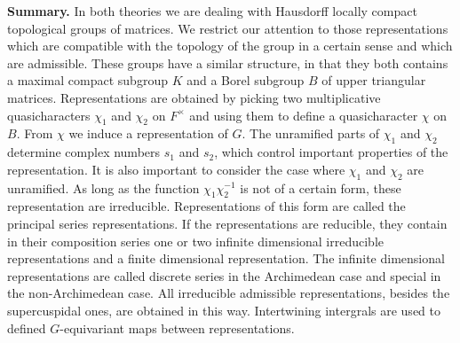 \documentclass[12pt, letterpaper, twoside]
{article}
\begin{document}
\textbf{Summary.} In both theories we are dealing with Hausdorff locally compact
topological groups of matrices. We restrict our attention to those
representations which are compatible with the topology of the group in a certain
sense and which are admissible. These groups have a similar structure, in that
they both contains a maximal compact subgroup $K$ and a Borel subgroup $B$ of
upper triangular matrices. Representations are obtained by picking two
multiplicative quasicharacters $\chi_1$ and $\chi_2$ on $F^\times$ and using
them to define a quasicharacter $\chi$ on $B$. From $\chi$ we induce a
representation of $G$. The unramified parts of $\chi_1$ and $\chi_2$ determine
complex numbers $s_1$ and $s_2$, which control important properties of the
representation. It is also important to consider the case where $\chi_1$ and
$\chi_2$ are unramified. As long as the function $\chi_1\chi_2^{-1}$ is not of a
certain form, these representation are irreducible. Representations of this form
are called the principal series representations. If the representations are
reducible, they contain in their composition series one or two infinite
dimensional irreducible representations and a finite dimensional representation.
The infinite dimensional representations are called discrete series in the
Archimedean case and special in the non-Archimedean case. All irreducible
admissible representations, besides the supercuspidal ones, are obtained in this
way. Intertwining intergrals are used to defined $G$-equivariant maps between
representations.
\end{document}

